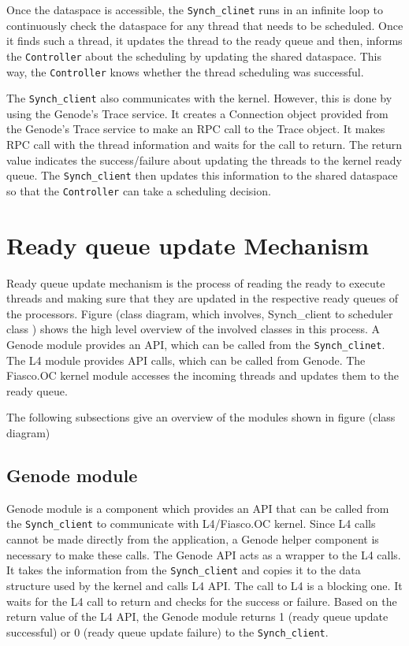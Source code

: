 Once the dataspace is accessible, the \texttt{Synch\_clinet} runs in an infinite loop to continuously check the dataspace for any thread that needs to be scheduled. Once it finds such a thread, it updates the thread to the ready queue and then, informs the \texttt{Controller} about the scheduling by updating the shared dataspace. This way, the \texttt{Controller} knows whether the thread scheduling was successful.

The \texttt{Synch\_client} also communicates with the kernel. However, this is done by using the Genode's Trace service. It creates a Connection object provided from the Genode's Trace service to make an RPC call to the Trace object. It makes RPC call with the thread information and waits for the call to return. The return value indicates the success/failure about updating the threads to the kernel ready queue. The \texttt{Synch\_client} then updates this information to the shared dataspace so that the \texttt{Controller} can take a scheduling decision.

\section{Ready queue update Mechanism} \label{design:rqupdate}
 
 Ready queue update mechanism is the process of reading the ready to execute threads and making sure that they are updated in the respective ready queues of the processors. Figure (class diagram, which involves, Synch\_client to scheduler class ) %
shows the high level overview of the involved classes in this process.
A Genode module provides an API, which can be called from the \texttt{Synch\_clinet}. The L4 module provides API calls, which can be called from Genode. The Fiasco.OC kernel module accesses the incoming threads and updates them to the ready queue.

The following subsections give an overview of the modules shown in figure (class diagram)%

\subsection{Genode module}
Genode module is a component which provides an API that can be called from the \texttt{Synch\_client} to communicate with L4/Fiasco.OC kernel. Since L4 calls cannot be made directly from the application, a Genode helper component is necessary to make these calls. The Genode API acts as a wrapper to the L4 calls. It takes the information from the \texttt{Synch\_client} and copies it to the data structure used by the kernel and calls L4 API. The call to L4 is a blocking one. It waits for the L4 call to return and checks for the success or failure. Based on the return value of the L4 API, the Genode module returns 1 (ready queue update successful) or 0 (ready queue update failure) to the \texttt{Synch\_client}.

